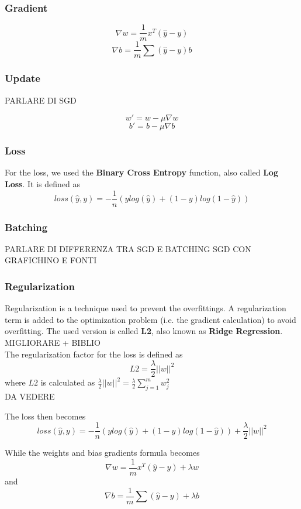 \documentclass[
	letterpaper, %
	10pt, %
]{class}
\begin{document}
\subsubsection{Gradient}

$$ \nabla w = \frac{1}{m}x^T(\hat{y} - y) $$
$$\nabla b = \frac{1}{m}\sum(\hat{y} - y) b $$

\subsubsection{Update}

PARLARE DI SGD

$$ w' = w - \mu \nabla w $$
$$ b' = b - \mu \nabla b $$

\subsubsection{Loss}
For the loss, we used the \textbf{Binary Cross Entropy} function, also called \textbf{Log Loss}.
It is defined as
$$ loss(\hat{y}, y) = -\frac{1}{n}(y log(\hat{y}) + (1-y)log(1-\hat{y})) $$

\subsubsection{Batching}
PARLARE DI DIFFERENZA TRA SGD E BATCHING SGD CON GRAFICHINO E FONTI

\subsubsection{Regularization}
Regularization is a technique used to prevent the overfittings. A regularization term is added to the optimization problem (i.e. the gradient calculation) to avoid overfitting.
The used version is called \textbf{L2}, also known as \textbf{Ridge Regression}. MIGLIORARE + BIBLIO\\

The regularization factor for the loss is defined as
$$ L2 = \frac{\lambda}{2}||w||^2 $$
where $L2$ is calculated as $ \frac{\lambda}{2}||w||^2 = \frac{\lambda}2{\displaystyle\sum_{j=1}^m w_j^2} $ \\
DA VEDERE

The loss then becomes
$$ loss(\hat{y}, y) = -\frac{1}{n}(y log(\hat{y}) + (1-y)log(1-\hat{y})) + \frac{\lambda}{2}||w||^2 $$

While the weights and bias gradients formula becomes
$$ \nabla w = \frac{1}{m}x^T(\hat{y} - y) + \lambda w $$
and
$$ \nabla b = \frac{1}{m}\sum(\hat{y} - y) + \lambda b$$
\end{document}
